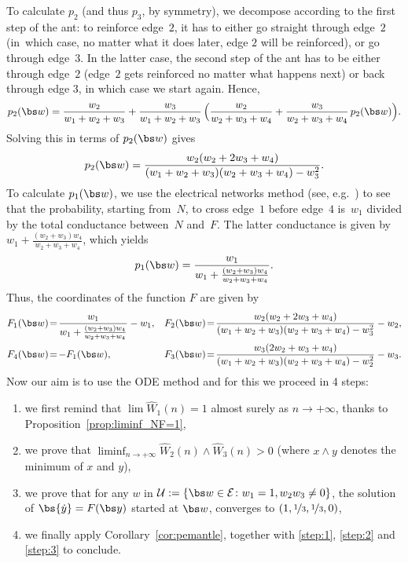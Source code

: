 To calculate $p_2$ (and thus $p_3$, by symmetry),
we decompose according to the first step of the ant: to reinforce edge~$2$, it has to either go straight through edge~$2$ (in~which case, no matter what it does later, edge $2$ will be reinforced), or go through edge~$3$. In the latter case, the second step of the ant has to be either through edge~$2$ (edge~$2$ gets reinforced no matter what happens next) or back through edge $3$, in which case we start again. Hence,
\[
p_2(\bs w) = \frac{w_2}{w_1+w_2+w_3} + \frac{w_3}{w_1+w_2+w_3}\, \Bigl(\frac{w_2}{w_2+w_3+w_4} +\frac{w_3}{w_2+w_3+w_4} \, p_2(\bs w)\Bigr).
\]
Solving this in terms of $p_2(\bs w)$
gives
\[
p_2(\bs w) = \frac{w_2(w_2+2w_3+w_4)}{(w_1+w_2+w_3)(w_2+w_3+w_4)-w_3^2}.
\]
To calculate $p_1(\bs w)$,
we use the electrical networks method (see, e.g.~\cite{LL}) to see that the probability, starting from~$N$, to cross edge~$1$ before edge~$4$ is~$w_1$ divided by the total conductance between~$N$ and~$F$.
The latter conductance is given by $w_1 + \frac{(w_2+w_3)w_4}{w_2+w_3+w_4}$, which yields
\[
p_1(\bs w)=\frac{w_1}{w_1 + \frac{(w_2+w_3)w_4}{w_2+w_3+w_4}}.
\]
Thus, the coordinates of the function $F$ are given by
\begin{align*}
F_1(\bs w) &\!=\! \frac{w_1}{w_1 + \frac{(w_2+w_3)w_4}{w_2+w_3+w_4}}-w_1,
& F_2(\bs w) &\!=\! \frac{w_2(w_2+2w_3+w_4)}{(w_1+w_2+w_3)(w_2+w_3+w_4)-w_3^2}-w_2,
\\
F_4(\bs w) &\!=\! -F_1(\bs w),
&F_3(\bs w) &\!=\! \frac{w_3(2w_2+w_3+w_4)}{(w_1+w_2+w_3)(w_2+w_3+w_4)-w_2^2}-w_3.
\end{align*}Now our aim is to use the ODE method and for this we proceed in 4 steps:
\begin{enumerate}
\item\label{step:1}
we first remind that $\lim {\hat W_1(n)} = 1$ almost surely as $n\to+\infty$, thanks to Proposition~\ref{prop:liminf_NF=1},

\item\label{step:2}
we prove that $\liminf_{n\to+\infty}{\hat W_2(n)\wedge \hat W_3(n)}>0$ (where $x\wedge y$ denotes the minimum of $x$ and $y$),

\item\label{step:3}
we prove that for any $w$ in $\mathcal U: = \{\bs w\in \mathcal E\colon w_1 = 1, w_2w_3\neq 0\}$, the solution of ${\bs{\dot y}} =F({\bs y})$ started at $\bs w$, converges to $(1, \nicefrac13, \nicefrac13, 0)$,

\item\label{step:4}
we finally apply Corollary~\ref{cor:pemantle}, together with \eqref{step:1}, \eqref{step:2} and \eqref{step:3} to conclude.
\end{enumerate}

